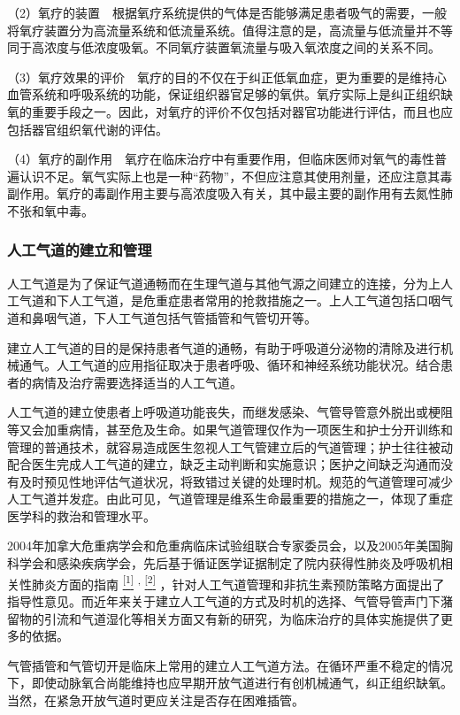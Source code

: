（2）氧疗的装置　根据氧疗系统提供的气体是否能够满足患者吸气的需要，一般将氧疗装置分为高流量系统和低流量系统。值得注意的是，高流量与低流量并不等同于高浓度与低浓度吸氧。不同氧疗装置氧流量与吸入氧浓度之间的关系不同。

（3）氧疗效果的评价　氧疗的目的不仅在于纠正低氧血症，更为重要的是维持心血管系统和呼吸系统的功能，保证组织器官足够的氧供。氧疗实际上是纠正组织缺氧的重要手段之一。因此，对氧疗的评价不仅包括对器官功能进行评估，而且也应包括器官组织氧代谢的评估。

（4）氧疗的副作用　氧疗在临床治疗中有重要作用，但临床医师对氧气的毒性普遍认识不足。氧气实际上也是一种“药物”，不但应注意其使用剂量，还应注意其毒副作用。氧疗的毒副作用主要与高浓度吸入有关，其中最主要的副作用有去氮性肺不张和氧中毒。

\subsubsection{人工气道的建立和管理}

人工气道是为了保证气道通畅而在生理气道与其他气源之间建立的连接，分为上人工气道和下人工气道，是危重症患者常用的抢救措施之一。上人工气道包括口咽气道和鼻咽气道，下人工气道包括气管插管和气管切开等。

建立人工气道的目的是保持患者气道的通畅，有助于呼吸道分泌物的清除及进行机械通气。人工气道的应用指征取决于患者呼吸、循环和神经系统功能状况。结合患者的病情及治疗需要选择适当的人工气道。

人工气道的建立使患者上呼吸道功能丧失，而继发感染、气管导管意外脱出或梗阻等又会加重病情，甚至危及生命。如果气道管理仅作为一项医生和护士分开训练和管理的普通技术，就容易造成医生忽视人工气管建立后的气道管理；护士往往被动配合医生完成人工气道的建立，缺乏主动判断和实施意识；医护之间缺乏沟通而没有及时预见性地评估气道状况，将致错过关键的处理时机。规范的气道管理可减少人工气道并发症。由此可见，气道管理是维系生命最重要的措施之一，体现了重症医学科的救治和管理水平。

2004年加拿大危重病学会和危重病临床试验组联合专家委员会，以及2005年美国胸科学会和感染疾病学会，先后基于循证医学证据制定了院内获得性肺炎及呼吸机相关性肺炎方面的指南
\protect\hyperlink{text00015.htmlux5cux23ch1-14}{\textsuperscript{{[}1{]}}}
\textsuperscript{,}
\protect\hyperlink{text00015.htmlux5cux23ch2-14}{\textsuperscript{{[}2{]}}}
，针对人工气道管理和非抗生素预防策略方面提出了指导性意见。而近年来关于建立人工气道的方式及时机的选择、气管导管声门下潴留物的引流和气道湿化等相关方面又有新的研究，为临床治疗的具体实施提供了更多的依据。

气管插管和气管切开是临床上常用的建立人工气道方法。在循环严重不稳定的情况下，即使动脉氧合尚能维持也应早期开放气道进行有创机械通气，纠正组织缺氧。当然，在紧急开放气道时更应关注是否存在困难插管。

